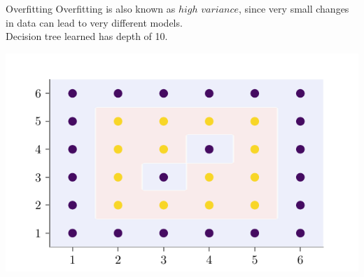 \documentclass[usenames,dvipsnames]{beamer}
\begin{document}
\begin{frame}{Overfitting}
Overfitting is also known as $high$ $variance$, since very small changes in data can lead to very different models.\\
Decision tree learned has depth of 10.
\begin{center}
\includegraphics[scale=0.5]{../assets/bias-variance/figures/bias-variance-full-depth.pdf}
\end{center}
\end{frame}
\end{document}

